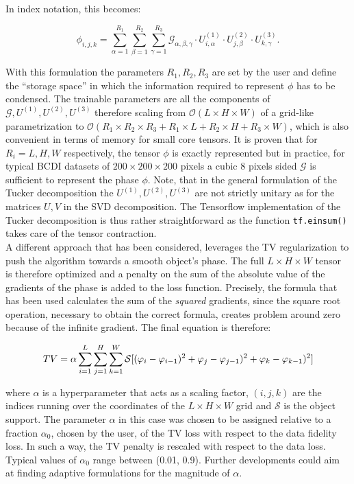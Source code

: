 In index notation, this becomes:

\[
\mathcal{\phi}_{i,j,k} = \sum_{\alpha=1}^{R_1} \sum_{\beta=1}^{R_2} \sum_{\gamma=1}^{R_3}
\mathcal{G}_{\alpha,\beta,\gamma} \cdot U^{(1)}_{i,\alpha} \cdot U^{(2)}_{j,\beta} \cdot U^{(3)}_{k,\gamma}.
\]

With this formulation the parameters $R_1, R_2, R_3$ are set by the user and define the ``storage space'' in which the 
information required to represent $\phi$ has to be condensed. The trainable parameters are all the components of 
$\mathcal{G}, U^{(1)}, U^{(2)},  U^{(3)}$ therefore scaling from $\mathcal{O}(L \times H \times W) $ of a grid-like 
parametrization to $\mathcal{O}(R_1 \times R_2 \times R_3 + R_1\times L + R_2\times H + R_3\times W)$, 
which is also convenient in terms of memory for small core tensors. It is proven that for $R_i = L,H,W$ respectively, the 
tensor $\phi$ is exactly represented but in practice, for typical BCDI datasets of $200 \times 200 \times 200$ pixels
a cubic 8 pixels sided $\mathcal{G}$ is sufficient to represent the phase $\phi$. Note, that in the general formulation of the Tucker 
decomposition the $ U^{(1)}, U^{(2)},  U^{(3)}$ are not strictly unitary as for the matrices $U, V$ in the SVD decomposition.  
The Tensorflow implementation of the Tucker decomposition is thus rather straightforward as the function 
\texttt{tf.einsum()} takes care of the tensor contraction.\\

A different approach that has been considered, leverages the TV regularization to push the algorithm towards a smooth object's 
phase. The full $L\times H\times W$ tensor is therefore optimized and a penalty on the sum of the absolute value of the 
gradients of the phase is added to the loss function. Precisely, the formula that has been used calculates the sum of the 
\textit{squared} gradients, since the square root operation, necessary to obtain the correct formula, creates 
problem around zero because of the infinite gradient. The final equation is therefore: 

\begin{equation}
\centering
   TV =  \alpha \sum_{i = 1}^{L}\sum_{j = 1}^{H}\sum_{k = 1}^{W} \mathcal S[(\varphi_{i} - \varphi_{i-1})^2 + \varphi_{j} - \varphi_{j-1})^2 +  \varphi_{k} - \varphi_{k-1})^2]
\end{equation}

where $\alpha $ is a hyperparameter that acts as a scaling factor, $(i,j,k)$ are the indices running over the coordinates of
the $L\times H\times W$ grid and $\mathcal S$ is the object support. The parameter $\alpha $ in this case was chosen 
to be assigned relative to a fraction $\alpha_0 $, chosen by the user, of the TV loss with respect to the data fidelity loss. 
In such a way, the TV penalty is rescaled with respect to the data loss. Typical values of $\alpha_0 $ range between (0.01, 0.9). 
Further developments could aim at finding adaptive formulations for the magnitude of $\alpha $. 


